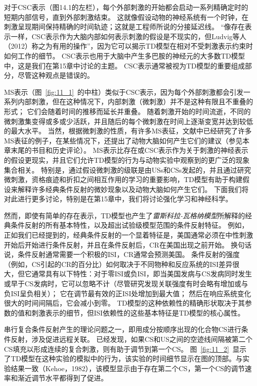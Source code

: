 {对于CSC表示（图14.1的左栏），每个外部刺激的开始都会启动一系列精确定时的短期内部信号，直到外部刺激结束。
这就像假设动物的神经系统有一个时钟，在刺激呈现期间保持精确的时间轨迹；这就是工程师所说的分接延迟线。
“像存在表示一样，CSC表示作为大脑内部如何表示刺激的假设是不现实的，但Ludvig等人（2012）称之为有用的操作”，因为它可以揭示TD模型在相对不受刺激表示约束时如何工作的细节。
CSC表示也用于大脑中产生多巴胺的神经元的大多数TD模型中，这是我们在第15章中讨论的主题。
CSC表示通常被视为TD模型的重要组成部分，尽管这种观点是错误的。


MS表示（图~\ref{fig:11_1}~的中柱）类似于CSC表示，因为每个外部刺激都会引发一系列内部刺激，但在这种情况下，内部刺激（微刺激）并不是这种有限且不重叠的形式；
它们会随着时间的推移而延长并重叠。
随着刺激开始的时间流逝，不同的微刺激集变得或多或少活跃，并且随后的每个微刺激在时间上逐渐变宽并达到较低的最大水平。
当然，根据微刺激的性质，有许多MS表征，文献中已经研究了许多MS表征的例子，在某些情况下，还提出了动物大脑如何产生它们的建议（参见本章末尾的书目和历史评论）。
MS表示比存在或CSC表示作为关于刺激的神经表示的假设更现实，并且它们允许TD模型的行为与动物实验中观察到的更广泛的现象集合相关。
特别是，通过假设微刺激的级联是由USs和CSs发起的，并且通过研究微刺激，资格痕迹和折扣之间相互作用的学习的重要影响，TD模型有助于构建假设来解释许多经典条件反射的微妙现象以及动物大脑如何产生它们。
下面我们将对此进行更多讨论，特别是在第15章中，我们将讨论强化学习和神经科学。


然而，即使有简单的存在表示，TD模型也产生了\textit{雷斯科拉-瓦格纳模型}所解释的经典条件反射的所有基本特性，以及超出试验级模型范围的条件反射特征。
例如，正如我们已经提到的，经典条件反射的一个显着特征是，美国通常必须在中性刺激开始后开始进行条件反射，并且在条件反射后，CR在美国出现之前开始。
换句话说，条件反射通常需要一个积极的ISI，CR通常会预测美国。
条件反射的强度（例如，CS引起的CR的百分比）如何取决于不同物种和反应系统的ISI差异很大，但它通常具有以下特性：对于零ISI或负ISI，即当美国发病与CS发病同时发生或早于CS发病时，它可以忽略不计（尽管研究发现关联强度有时会略有增加或与负ISI呈负相关）；
它在调节最有效的正ISI处增加到最大值；
然后在响应系统变化很大的时间间隔后，它会减小到零。
TD模型的这种依赖性的精确形状取决于其参数的值和刺激表示的细节，但ISI依赖性的这些基本特征是TD模型的核心属性。


串行复合条件反射产生的理论问题之一，即用成分按顺序出现的化合物CS进行条件反射，涉及促进远程关联。
已经发现，如果CS和US之间的空迹线间隔被第二个CS填充以形成连续的复合刺激，则有助于调节到第一个CS。
图~\ref{fig:11_2}~显示了TD模型在这种实验的模拟中的行为，该实验的时间细节显示在图的顶部。与实验结果一致（Kehoe，1982），该模型显示由于存在第二个CS，第一个CS的调节速率和渐近调节水平都得到了促进。

}
